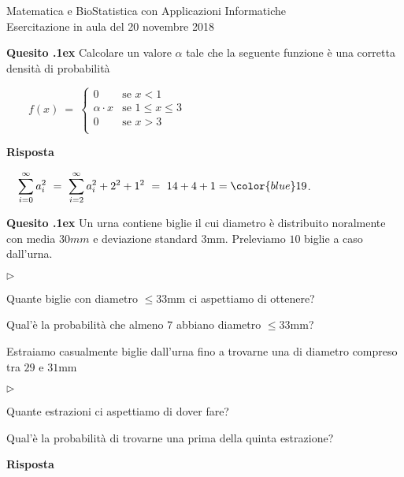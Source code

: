 \documentclass[11pt,twoside,a4paper]{article}
\newcommand{\mylabel}[1]{#1\hfill}
\renewenvironment{itemize}
  {\begin{list}{$\triangleright$}{%
   \setlength{\parskip}{0mm}
   \setlength{\topsep}{.4\baselineskip}
   \setlength{\rightmargin}{0mm}
   \setlength{\listparindent}{0mm}
   \setlength{\itemindent}{0mm}
   \setlength{\labelwidth}{2ex}
   \setlength{\itemsep}{.4\baselineskip}
   \setlength{\parsep}{0mm}
   \setlength{\partopsep}{0mm}
   \setlength{\labelsep}{1ex}
   \setlength{\leftmargin}{\labelwidth+\labelsep}
   \let\makelabel\mylabel}}{%
   \end{list}\vspace*{-1.3mm}}
\newcounter{quesito}
\newenvironment{question}{\addtocounter{quesito}{1}\par\textbf{Quesito \thequesito.\kern1ex}}{\vspace{0.5\parskip}}
\newenvironment{answer}{\par\textbf{Risposta\quad}}{\vspace{\parskip}}
\begin{document}
\colorbox{blue!10}{\begin{minipage}{\textwidth}
Matematica e BioStatistica con Applicazioni Informatiche\\
Esercitazione in aula del 20 novembre 2018
\end{minipage}}




\begin{question}
Calcolare un valore $\alpha$ tale che la seguente funzione è una corretta densità di probabilità

$\displaystyle\qquad f(x)\ =\ \left\{
\begin{array}{ll}
0& \textrm{se }x<1\\
\alpha\cdot x& \textrm{se } 1\le x\le 3\\
0& \textrm{se }x>3\\
\end{array}\right.$
\begin{answer}

$\quad\displaystyle\sum^{\infty}_{i=0}a^2_i
\ =\ \sum^{\infty}_{i=2}a^2_i+2^2+1^2
\ =\ 14+4+1={\color{blue}19}$.
\end{answer}
\end{question}



\begin{question}
Un urna contiene biglie il cui diametro è distribuito noralmente con media $30mm$ e deviazione standard $3$mm. Preleviamo $10$ biglie a caso dall'urna. 

\begin{itemize}
\item[1.] Quante biglie con diametro $\le 33$mm ci aspettiamo di ottenere? 
\item[2.] Qual'è la probabilità che almeno $7$ abbiano diametro $\le 33$mm?
\end{itemize}

Estraiamo casualmente biglie dall'urna fino a trovarne una di diametro compreso tra $29$ e $31$mm

\begin{itemize}
\item[1.] Quante estrazioni ci aspettiamo di dover fare? 
\item[2.] Qual'è la probabilità di trovarne una prima della quinta estrazione?
\end{itemize}

\begin{answer}
\end{answer}
\end{question}
\end{document}
